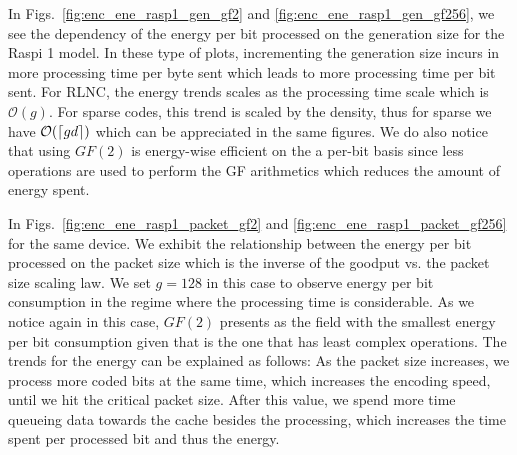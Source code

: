%
In Figs.~\ref{fig:enc_ene_rasp1_gen_gf2} and \ref{fig:enc_ene_rasp1_gen_gf256},
we see the dependency of the energy per bit processed on the generation size
for the \ac{Raspi} 1 model. In these type of plots, incrementing the
generation size incurs in more processing time per byte sent which leads to
more processing time per bit sent. For \ac{RLNC}, the energy trends
scales as the processing time scale which is $\mathcal{O}(g)$. For sparse
codes, this trend is scaled by the density, thus for sparse we have
$\mathcal{O}(\left\lceil gd\right\rceil)$ which can be appreciated in the same figures. We
do also notice that using $GF(2)$ is energy-wise efficient on the a
per-bit basis since less operations are used to perform the \ac{GF}
arithmetics which reduces the amount of energy spent.

In Figs.~\ref{fig:enc_ene_rasp1_packet_gf2} and
\ref{fig:enc_ene_rasp1_packet_gf256} for the same device. We exhibit the
relationship between the energy per bit processed on the packet size which
is the inverse of the goodput vs. the packet size scaling law. We set
$g = 128$ in this case to observe energy per bit consumption in the regime where the
processing time is considerable. As we notice again in this case,
$GF(2)$ presents as the field with the smallest energy per bit consumption
given that is the one that has least complex operations. The trends
for the energy can be explained as follows: As the packet size increases,
we process more coded bits at the same time, which increases the encoding
speed, until we hit the critical packet size. After this value, we spend
more time queueing data towards the cache besides the processing, which
increases the time spent per processed bit and thus the energy.
%

